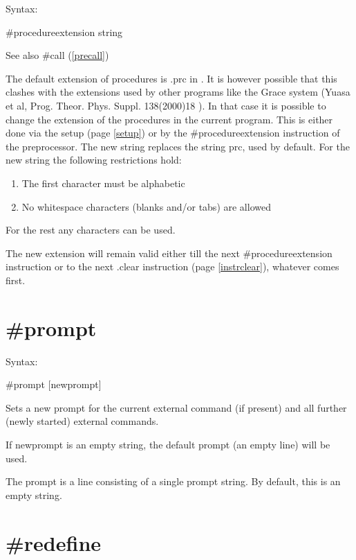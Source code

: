 \noindent Syntax:

\#procedureextension string
 
\noindent See also \#call (\ref{precall})

\noindent The default extension of procedures 
is .prc in \FORM. It is however possible that this clashes with 
the extensions used by other programs like the Grace system 
(Yuasa et al, Prog. Theor. Phys. Suppl. 138(2000)18 ). In that case it is 
possible to change the extension of the procedures in the current program. 
This is either done via the setup (page \ref{setup}) or by the 
\#procedureextension instruction of the preprocessor. The new string 
replaces the string prc, used by default. For the new string the following 
restrictions hold:
\begin{enumerate}
\item The first character must be alphabetic
\item No whitespace characters (blanks and/or tabs) are allowed
\end{enumerate}
For the rest any characters can be used.

\noindent The new extension will remain valid either till the next 
\#procedureextension instruction or to the next .clear 
instruction (page \ref{instrclear}), whatever comes first.


\section{\#prompt}
\label{preprompt}

\noindent Syntax:

\#prompt [newprompt]

\noindent Sets a new prompt for the current external 
command (if present) and all further (newly started) external commands.

If newprompt is an empty string, the default prompt (an empty line) will be 
used.

The prompt is a line consisting of a single prompt string. By 
default, this is an empty string.


\section{\#redefine}
\label{preredefine}


